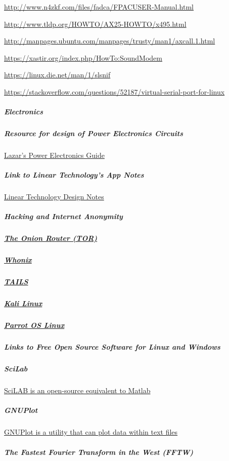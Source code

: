 \href{http://www.n4zkf.com/files/fadca/FPACUSER-Manual.html}{http://www.n4zkf.com/files/fadca/FPACUSER-Manual.html}

\href{http://www.tldp.org/HOWTO/AX25-HOWTO/x495.html}{http://www.tldp.org/HOWTO/AX25-HOWTO/x495.html}

\href{http://manpages.ubuntu.com/manpages/trusty/man1/axcall.1.html}{http://manpages.ubuntu.com/manpages/trusty/man1/axcall.1.html}

\href{https://xastir.org/index.php/HowTo:SoundModem}{https://xastir.org/index.php/HowTo:SoundModem}

\href{https://linux.die.net/man/1/slsnif}{https://linux.die.net/man/1/slsnif}

\href{https://stackoverflow.com/questions/52187/virtual-serial-port-for-linux}{https://stackoverflow.com/questions/52187/virtual-serial-port-for-linux}

\subparagraph{Electronics}

\subparagraph{Resource for design of Power Electronics Circuits}

\href{http://www.smps.us/}{Lazar's Power Electronics Guide}

\subparagraph{Link to Linear Technology's App Notes}

\href{http://www.linear.com/doclist/design\_note}{Linear Technology Design Notes}

\subparagraph{Hacking and Internet Anonymity}

\subparagraph{\href{https://www.torproject.org/}{The Onion Router (TOR)}}

\subparagraph{\href{https://www.whonix.org/}{Whonix}}

\subparagraph{\href{https://tails.boum.org/}{TAILS}}

\subparagraph{\href{https://www.kali.org/}{Kali Linux}}

\subparagraph{\href{https://www.parrotsec.org/}{Parrot OS Linux}}

\subparagraph{Links to Free Open Source Software for Linux and Windows}

\subparagraph{SciLab}

\href{https://www.scilab.org/}{SciLAB is an open-source equivalent to Matlab}

\subparagraph{GNUPlot}

\href{http://www.gnuplot.info}{GNUPlot is a utility that can plot data within text files}

\subparagraph{The Fastest Fourier Transform in the West (FFTW)}

